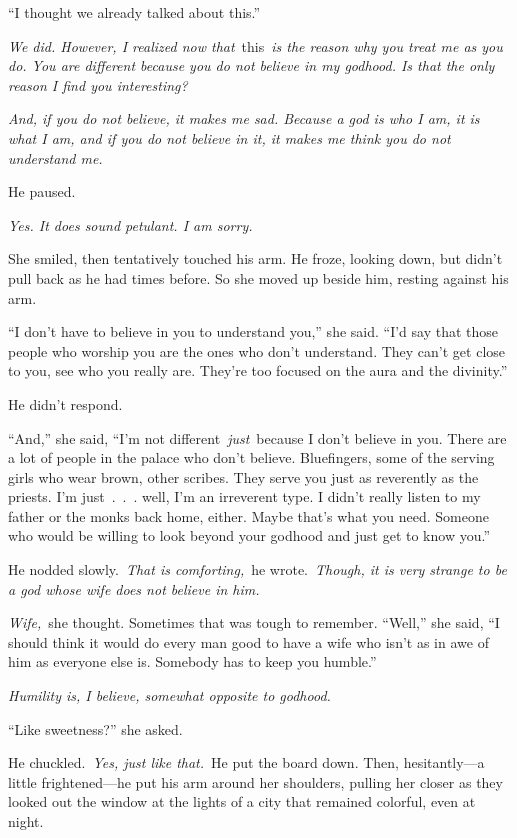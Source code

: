 “I thought we already talked about this.”

\textit{We did. However, I realized now that}~this~\textit{is the reason why you treat me as you do. You are different because you do not believe in my godhood. Is that the only reason I find you interesting?}

\textit{And, if you do not believe, it makes me sad. Because a god is who I am, it is what I am, and if you do not believe in it, it makes me think you do not understand me.}

He paused.

\textit{Yes. It does sound petulant. I am sorry.}

She smiled, then tentatively touched his arm. He froze, looking down, but didn’t pull back as he had times before. So she moved up beside him, resting against his arm.

“I don’t have to believe in you to understand you,” she said. “I’d say that those people who worship you are the ones who don’t understand. They can’t get close to you, see who you really are. They’re too focused on the aura and the divinity.”

He didn’t respond.

“And,” she said, “I’m not different~\textit{just}~because I don’t believe in you. There are a lot of people in the palace who don’t believe. Bluefingers, some of the serving girls who wear brown, other scribes. They serve you just as reverently as the priests. I’m just~.~.~. well, I’m an irreverent type. I didn’t really listen to my father or the monks back home, either. Maybe that’s what you need. Someone who would be willing to look beyond your godhood and just get to know you.”

He nodded slowly.~\textit{That is comforting,}~he wrote.~\textit{Though, it is very strange to be a god whose wife does not believe in him.}

\textit{Wife,}~she thought. Sometimes that was tough to remember. “Well,” she said, “I should think it would do every man good to have a wife who isn’t as in awe of him as everyone else is. Somebody has to keep you humble.”

\textit{Humility is, I believe, somewhat opposite to godhood.}

“Like sweetness?” she asked.

He chuckled.~\textit{Yes, just like that.}~He put the board down. Then, hesitantly—a little frightened—he put his arm around her shoulders, pulling her closer as they looked out the window at the lights of a city that remained colorful, even at night.


